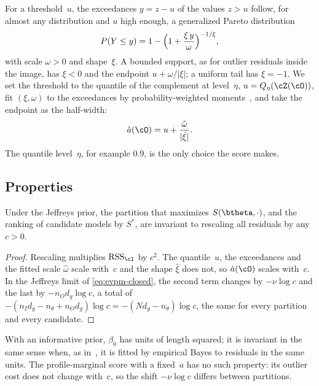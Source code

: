 For a threshold~$u$, the exceedances $y = z - u$ of the values $z > u$
follow, for almost any distribution and $u$ high enough, a generalized
Pareto distribution~\cite{Pickands1975,Balkema1974}
\begin{equation}
	P(Y \le y) = 1 - \Bigl(1 + \frac{\xi\,y}{\omega}\Bigr)^{-1/\xi},
	\label{eq:gpd}
\end{equation}
with scale $\omega > 0$ and shape~$\xi$.  A bounded support, as for outlier
residuals inside the image, has $\xi < 0$ and the endpoint
$u + \omega/|\xi|$; a uniform tail has $\xi = -1$.  We set the threshold to
the quantile of the complement at level~$\eta$, $u = Q_\eta(\cZ(\cO))$, fit
$(\xi, \omega)$ to the exceedances by probability-weighted
moments~\cite{Hosking1987}, and take the endpoint as the half-width:
\begin{equation}
	\ahat(\cO) = u + \frac{\hat\omega}{|\hat\xi|}.
	\label{eq:endpoint}
\end{equation}
The quantile level~$\eta$, for example $0.9$, is the only choice the score
makes.

\subsection{Properties}
\label{sec:properties}

\begin{proposition}
	\label{prop:invariance}
	Under the Jeffreys prior, the partition that maximizes
	$S(\btheta, \cdot)$, and the ranking of candidate models
	by $S^*$, are invariant to rescaling all residuals by any
	$c > 0$.
\end{proposition}
\begin{proof}
	Rescaling multiplies $\RSS_\cI$ by $c^2$.  The quantile~$u$, the
	exceedances and the fitted scale $\hat\omega$ scale with~$c$ and the
	shape $\hat\xi$ does not, so $\ahat(\cO)$ scales with~$c$.  In the Jeffreys
	limit of \cref{eq:evpm-closed}, the second term changes by $-\nu\log c$
	and the last by $-n_O d_g\log c$, a total of
	$-(n_I d_g - n_\theta + n_O d_g)\log c = -(N d_g - n_\theta)\log c$,
	the same for every partition and every candidate.
\end{proof}
With an informative prior, $\beta_0$ has units of length squared; it is
invariant in the same sense when, as in~\cite{Pritts2026}, it is fitted by
empirical Bayes to residuals in the same units.  The profile-marginal score
with a fixed~$a$ has no such property: its outlier cost does not change
with~$c$, so the shift $-\nu\log c$ differs between partitions.

